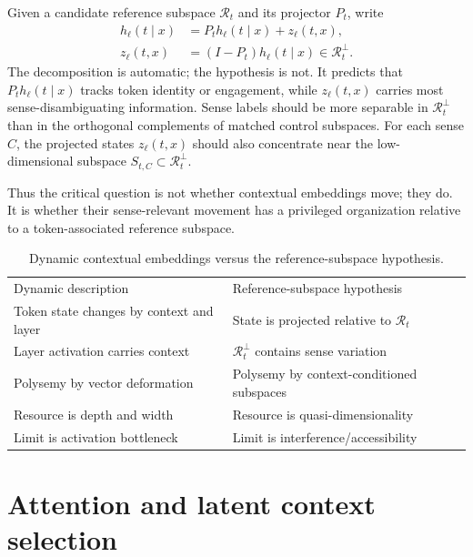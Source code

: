 \documentclass[
  aps,
  reprint,
  superscriptaddress,
  floatfix,
  nofootinbib,
  longbibliography
]{revtex4-2}
\begin{document}
Given a candidate reference subspace $\mathcal R_t$ and its projector $P_t$,
write
%
\begin{align}
\label{eq:layer-decomp}
h_\ell(t\mid x)
&=P_t h_\ell(t\mid x)+z_\ell(t,x),\\
z_\ell(t,x)&=(I-P_t)h_\ell(t\mid x)
\in\mathcal R_t^\perp.\nonumber
\end{align}
%
The decomposition is automatic; the hypothesis is not. It predicts that
$P_t h_\ell(t\mid x)$ tracks token identity or engagement, while
$z_\ell(t,x)$ carries most sense-disambiguating information. Sense labels
should be more separable in $\mathcal R_t^\perp$ than in the orthogonal
complements of matched control subspaces. For each sense $C$, the projected
states $z_\ell(t,x)$ should also concentrate near the low-dimensional
subspace $S_{t,C}\subset\mathcal R_t^\perp$.

Thus the critical question is not whether contextual embeddings move; they
do. It is whether their sense-relevant movement has a privileged
organization relative to a token-associated reference subspace.

\begin{table}[ht]
\caption{Dynamic contextual embeddings versus the reference-subspace
hypothesis.}
\label{tab:two-views}
\centering
\begin{minipage}{0.72\textwidth}
\begin{ruledtabular}
\begin{tabular}{@{}ll@{}}
Dynamic description & Reference-subspace hypothesis \\
\colrule
Token state changes by context and layer & State is projected relative to $\mathcal R_t$ \\
Layer activation carries context & $\mathcal R_t^\perp$ contains sense variation \\
Polysemy by vector deformation & Polysemy by context-conditioned subspaces \\
Resource is depth and width & Resource is quasi-dimensionality \\
Limit is activation bottleneck & Limit is interference/accessibility \\
\end{tabular}
\end{ruledtabular}
\end{minipage}
\end{table}

\section{Attention and latent context selection}
\label{sec:attention}
\end{document}
